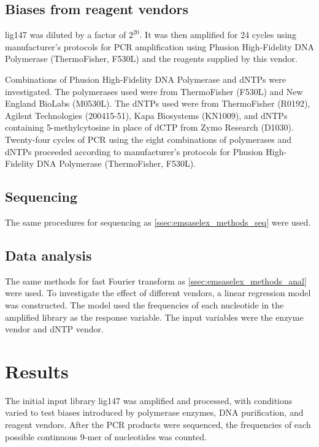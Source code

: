 \documentclass[parskip=full, numbers=noenddot]{scrbook}
\begin{document}
\subsection{Biases from reagent vendors}
\label{ssec:pcrbias_methods_reagent}

lig147 was diluted by a factor of $2^{20}$.  It was then amplified for 24 cycles using manufacturer's protocols for PCR amplification using Phusion High-Fidelity DNA Polymerase (ThermoFisher, F530L) and the reagents supplied by this vendor.

Combinations of Phusion High-Fidelity DNA Polymerase and dNTPs were investigated.  The polymerases used were from ThermoFisher (F530L) and New England BioLabs (M0530L).  The dNTPs used were from ThermoFisher (R0192), Agilent Technologies (200415-51), Kapa Biosystems (KN1009), and dNTPs containing 5-methylcytosine in place of dCTP from Zymo Research (D1030).  Twenty-four cycles of PCR using the eight combinations of polymerases and dNTPs proceeded according to manufacturer's protocols for Phusion High-Fidelity DNA Polymerase (ThermoFisher, F530L).

\subsection{Sequencing}
\label{ssec:pcrbias_methods_seq}

The same procedures for sequencing as \ref{ssec:emsaselex_methods_seq} were used.

\subsection{Data analysis}
\label{ssec:pcrbias_methods_anal}

The same methods for fast Fourier transform as \ref{ssec:emsaselex_methods_anal} were used.  To investigate the effect of different vendors, a linear regression model was constructed.  The model used the frequencies of each nucleotide in the amplified library as the response variable.  The input variables were the enzyme vendor and dNTP vendor.

\section{Results}
\label{sec:pcrbias_results}

The initial input library lig147 was amplified and processed, with conditions varied to test biases introduced by polymerase enzymes, DNA purification, and reagent vendors.  After the PCR products were sequenced, the frequencies of each possible continuous 9-mer of nucleotides was counted.
\end{document}
